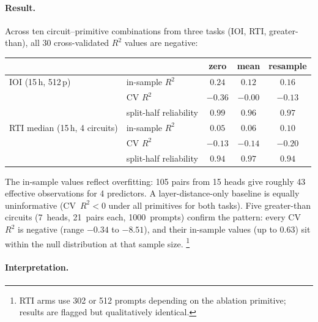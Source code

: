 \documentclass{article}
\begin{document}
\paragraph{Result.}

Across ten circuit--primitive combinations from three tasks (IOI, RTI,
greater-than), all 30 cross-validated $R^2$ values are negative:

\medskip

\begin{tabular}{llccc}
\toprule
 & & zero & mean & resample \\
\midrule
IOI (15\,h, 512\,p)
 & in-sample $R^2$ & $0.24$ & $0.12$ & $0.16$ \\
 & CV $R^2$ & $-0.36$ & $-0.00$ & $-0.13$ \\
 & split-half reliability & $0.99$ & $0.96$ & $0.97$ \\
\midrule
RTI median (15\,h, 4 circuits)
 & in-sample $R^2$ & $0.05$ & $0.06$ & $0.10$ \\
 & CV $R^2$ & $-0.13$ & $-0.14$ & $-0.20$ \\
 & split-half reliability & $0.94$ & $0.97$ & $0.94$ \\
\bottomrule
\end{tabular}

\medskip

\noindent The in-sample values reflect overfitting: 105 pairs from 15 heads
give roughly 43 effective observations for 4 predictors. A
layer-distance-only baseline is equally uninformative (CV~$R^2 < 0$ under
all primitives for both tasks). Five greater-than circuits (7~heads,
21~pairs each, 1000~prompts) confirm the pattern: every CV~$R^2$ is
negative (range $-0.34$ to $-8.51$), and their in-sample values (up to
$0.63$) sit within the null distribution at that sample size.%
\footnote{RTI arms use 302 or 512 prompts depending on the ablation
primitive; results are flagged but qualitatively identical.}

\paragraph{Interpretation.}
\end{document}
